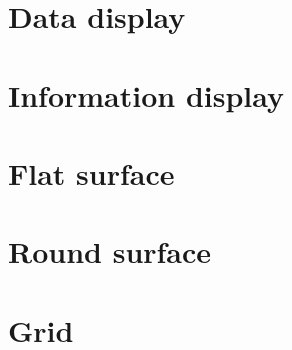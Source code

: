 \section{Data display} {
\label{sec:data_display}



}

\section{Information display} {
\label{sec:information_display}



}

\section{Flat surface} {
\label{sec:flat_surface}
	
}

\section{Round surface} {
\label{sec:round_surface}
	
}

\section{Grid} {
\label{sec:grid}
	
}